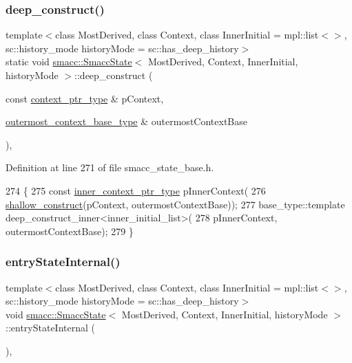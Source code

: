 \subsubsection{\texorpdfstring{deep\+\_\+construct()}{deep\_construct()}}
{\footnotesize\ttfamily template$<$class Most\+Derived, class Context, class Inner\+Initial = mpl\+::list$<$$>$, sc\+::history\+\_\+mode history\+Mode = sc\+::has\+\_\+deep\+\_\+history$>$ \\
static void \hyperlink{classsmacc_1_1SmaccState}{smacc\+::\+Smacc\+State}$<$ Most\+Derived, Context, Inner\+Initial, history\+Mode $>$\+::deep\+\_\+construct (\begin{DoxyParamCaption}\item[{const \hyperlink{classsmacc_1_1SmaccState_a0e15b77514301039f6bc093a9d3f6425}{context\+\_\+ptr\+\_\+type} \&}]{p\+Context,  }\item[{\hyperlink{classsmacc_1_1SmaccState_aaf76bbe2aa9dd73e3284605f84ab4b16}{outermost\+\_\+context\+\_\+base\+\_\+type} \&}]{outermost\+Context\+Base }\end{DoxyParamCaption})\hspace{0.3cm}{\ttfamily [inline]}, {\ttfamily [static]}}



Definition at line 271 of file smacc\+\_\+state\+\_\+base.\+h.


\begin{DoxyCode}
274     \{
275       \textcolor{keyword}{const} \hyperlink{classsmacc_1_1SmaccState_a65a772c2e2039e9a59148ba6ffb54d8a}{inner\_context\_ptr\_type} pInnerContext(
276           \hyperlink{classsmacc_1_1SmaccState_a1dccb401e1a99031863a21a590d953e6}{shallow\_construct}(pContext, outermostContextBase));
277       base\_type::template deep\_construct\_inner<inner\_initial\_list>(
278           pInnerContext, outermostContextBase);
279     \}
\end{DoxyCode}
\mbox{\label{classsmacc_1_1SmaccState_a084b95d0cb856d048fdb5ce81400eec7}} 
\subsubsection{\texorpdfstring{entry\+State\+Internal()}{entryStateInternal()}}
{\footnotesize\ttfamily template$<$class Most\+Derived, class Context, class Inner\+Initial = mpl\+::list$<$$>$, sc\+::history\+\_\+mode history\+Mode = sc\+::has\+\_\+deep\+\_\+history$>$ \\
void \hyperlink{classsmacc_1_1SmaccState}{smacc\+::\+Smacc\+State}$<$ Most\+Derived, Context, Inner\+Initial, history\+Mode $>$\+::entry\+State\+Internal (\begin{DoxyParamCaption}{ }\end{DoxyParamCaption})\hspace{0.3cm}{\ttfamily [inline]}, {\ttfamily [private]}}



